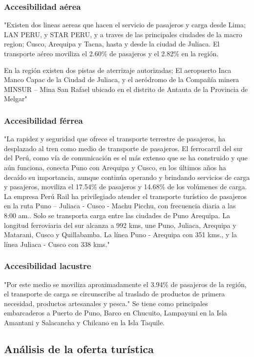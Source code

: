 \subsubsection{Accesibilidad aérea}
"Existen dos lineas aereas que hacen el servicio de pasajeros y carga desde Lima; LAN PERU, y STAR PERU, y a traves de las principales ciudades de la macro region; Cusco, Arequipa y Tacna, hasta y desde la ciudad de Juliaca. El transporte aéreo moviliza el 2.60\% de pasajeros y el 2.82\% en la región.

En la región existen dos pistas de aterrizaje autorizadas; El aeropuerto Inca Manco Capac de la Ciudad de Juliaca, y el aeródromo de la Compañía minera MINSUR – Mina San Rafael ubicado en el distrito de Antauta de la Provincia de Melgar" \cite{2011PlanPERTUR}
\subsubsection{Accesibilidad férrea}
"La rapidez y seguridad que ofrece el transporte terrestre de pasajeros, ha desplazado al tren como medio de transporte de pasajeros. El ferrocarril del sur del Perú, como vía de comunicación es el más extenso que se ha construido y que aún funciona, conecta Puno con Arequipa y Cusco, en los últimos años ha decaído su importancia, aunque continúa operando y brindando servicios de carga y pasajeros, moviliza el 17.54\% de pasajeros y 14.68\% de los volúmenes de carga. La empresa Perú Rail ha privilegiado atender el transporte turístico de pasajeros en la ruta Puno – Juliaca - Cusco - Machu Picchu, con frecuencia diaria a las 8:00 am.. Solo se transporta carga entre las ciudades de Puno Arequipa. La longitud ferroviaria del sur alcanza a 992 kms, une Puno, Juliaca, Arequipa y Matarani, Cusco y Quillabamba. La línea Puno - Arequipa con 351 kms., y la línea Juliaca - Cusco con 338 kms." \cite{2011PlanPERTUR}
\subsubsection{Accesibilidad lacustre}
"Por este medio se moviliza aproximadamente el 3.94\% de pasajeros de la región, el transporte de carga se circunscribe al traslado de productos de primera necesidad, productos artesanales y pesca." \cite{2011PlanPERTUR}
Se tiene  como principales embarcaderos a Puerto de Puno, Barco en Chucuito, Lampayuni en la Isla Amantani y Salacancha y Chilcano en la Isla Taquile.
\subsection{Análisis de la oferta turística}
